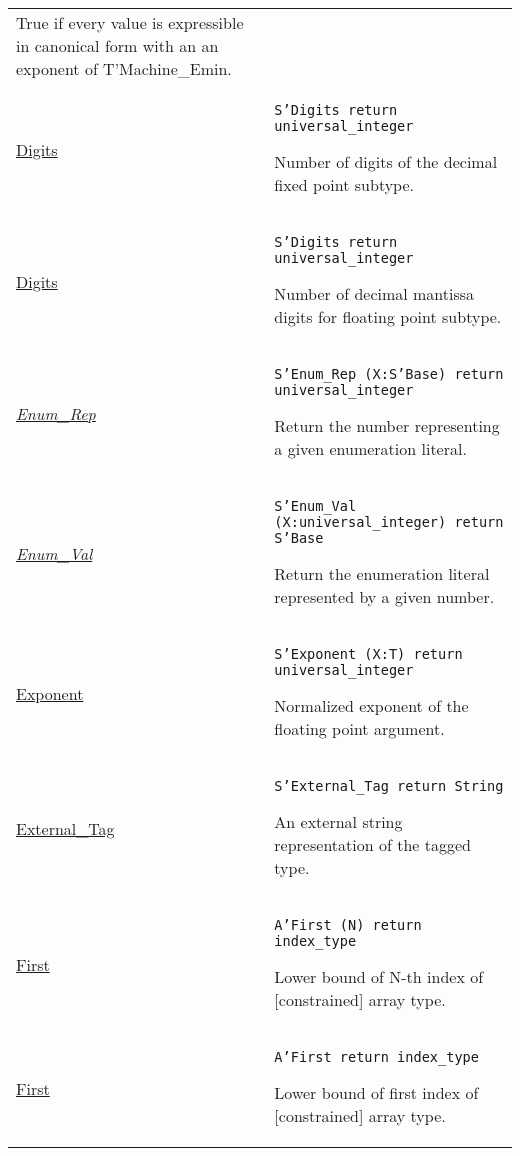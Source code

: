 \documentclass[english]{article}
\begin{document}
\begin{scriptsize}
\begin{multicols*}{3}
\begin{tabular}{@{}p{2cm}p{6.5cm}}
   True if every value is expressible in canonical form with an an exponent of T'Machine\_Emin.\\

   \href{http://www.ada-auth.org/standards/22rm/html/RM-K-2.html}{Digits} & \texttt{S'Digits return universal\_integer}

   Number of digits of the decimal fixed point subtype.\\

   \href{http://www.ada-auth.org/standards/22rm/html/RM-K-2.html}{Digits} & \texttt{S'Digits return universal\_integer}

   Number of decimal mantissa digits for floating point subtype.\\

   \href{http://www.ada-auth.org/standards/22rm/html/RM-K-2.html}{\textit{Enum\_Rep}} & \texttt{S'Enum\_Rep (X:S'Base) return universal\_integer}

   Return the number representing a given enumeration literal.\\

   \href{http://www.ada-auth.org/standards/22rm/html/RM-K-2.html}{\textit{Enum\_Val}} & \texttt{S'Enum\_Val (X:universal\_integer) return S'Base}

   Return the enumeration literal represented by a given number.\\

   \href{http://www.ada-auth.org/standards/22rm/html/RM-K-2.html}{Exponent} & \texttt{S'Exponent (X:T) return universal\_integer}

   Normalized exponent of the floating point argument.\\

   \href{http://www.ada-auth.org/standards/22rm/html/RM-K-2.html}{External\_Tag} & \texttt{S'External\_Tag return String}

   An external string representation of the tagged type.\\

   \href{http://www.ada-auth.org/standards/22rm/html/RM-K-2.html}{First} & \texttt{A'First (N) return index\_type}

   Lower bound of N-th index of [constrained] array type.\\

   \href{http://www.ada-auth.org/standards/22rm/html/RM-K-2.html}{First} & \texttt{A'First return index\_type}

   Lower bound of first index of [constrained] array type.\\


\end{tabular}
\end{multicols*}
\end{scriptsize}
\end{document}
